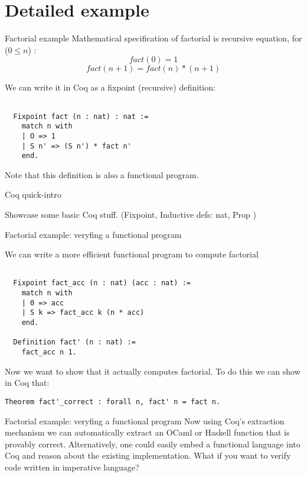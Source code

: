 \documentclass[10pt]{beamer}
\begin{document}
\section{Detailed example}


\begin{frame}[fragile]{Factorial example}
  Mathematical specification of factorial is recursive equation, for ($0 \leq n$) :
  \[ fact(0) = 1 \]
  \[ fact(n + 1) = fact(n)*(n+1) \]
  
  We can write it in Coq as a fixpoint (recursive) definition:
  \begin{lstlisting}[language=Coq]

  Fixpoint fact (n : nat) : nat :=
    match n with
    | O => 1
    | S n' => (S n') * fact n'
    end.

  \end{lstlisting}
  
  Note that this definition is also a functional program.
 
\end{frame}

\begin{frame}{Coq quick-intro}

Showcase some basic Coq stuff. (Fixpoint, Inductive defs: nat, Prop )
    
\end{frame}

\begin{frame}[fragile]{Factorial example: veryfing a functional program}

  We can write a more efficient functional program to compute factorial

  \begin{lstlisting}[language=Coq]

  Fixpoint fact_acc (n : nat) (acc : nat) :=
    match n with
    | 0 => acc
    | S k => fact_acc k (n * acc)
    end.

  Definition fact' (n : nat) :=
    fact_acc n 1.

  \end{lstlisting}

  Now we want to show that it actually computes factorial. To do this we can show in Coq that:
   \begin{lstlisting}[language=Coq]
  Theorem fact'_correct : forall n, fact' n = fact n.
  \end{lstlisting}
 
\end{frame}

\begin{frame}{Factorial example: veryfing a functional program}
Now using Coq's extraction mechanism we can automatically extract an OCaml or Haskell function that is provably correct. Alternatively, one could easily embed a functional language into Coq and reason about the existing implementation. What if you want to verify code written in imperative language?
  \end{frame}
\end{document}
